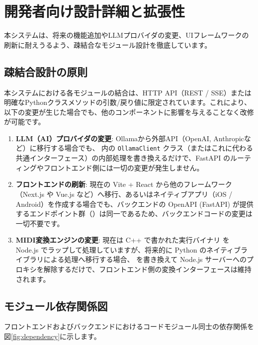 \section{開発者向け設計詳細と拡張性}

本システムは、将来の機能追加やLLMプロバイダの変更、UIフレームワークの刷新に耐えうるよう、疎結合なモジュール設計を徹底しています。

\subsection{疎結合設計の原則}

本システムにおける各モジュールの結合は、HTTP API（REST / SSE）または明確なPythonクラスメソッドの引数/戻り値に限定されています。これにより、以下の変更が生じた場合でも、他のコンポーネントに影響を与えることなく改修が可能です。

\begin{enumerate}
  \item \textbf{LLM（AI）プロバイダの変更}: 
    Ollamaから外部API（OpenAI, Anthropicなど）に移行する場合でも、 内の \texttt{OllamaClient} クラス（またはこれに代わる共通インターフェース）の内部処理を書き換えるだけで、FastAPI のルーティングやフロントエンド側には一切の変更が発生しません。
  \item \textbf{フロントエンドの刷新}:
    現在の Vite + React から他のフレームワーク（Next.js や Vue.js など）へ移行、あるいはネイティブアプリ（iOS / Android）を作成する場合でも、バックエンドの OpenAPI (FastAPI) が提供するエンドポイント群（）は同一であるため、バックエンドコードの変更は一切不要です。
  \item \textbf{MIDI変換エンジンの変更}:
    現在は C++ で書かれた実行バイナリ  を Node.js でラップして処理していますが、将来的に Python のネイティブライブラリによる処理へ移行する場合、 を書き換えて Node.js サーバーへのプロキシを解除するだけで、フロントエンド側の変換インターフェースは維持されます。
\end{enumerate}

\subsection{モジュール依存関係図}

フロントエンドおよびバックエンドにおけるコードモジュール同士の依存関係を図\ref{fig:dependency}に示します。

